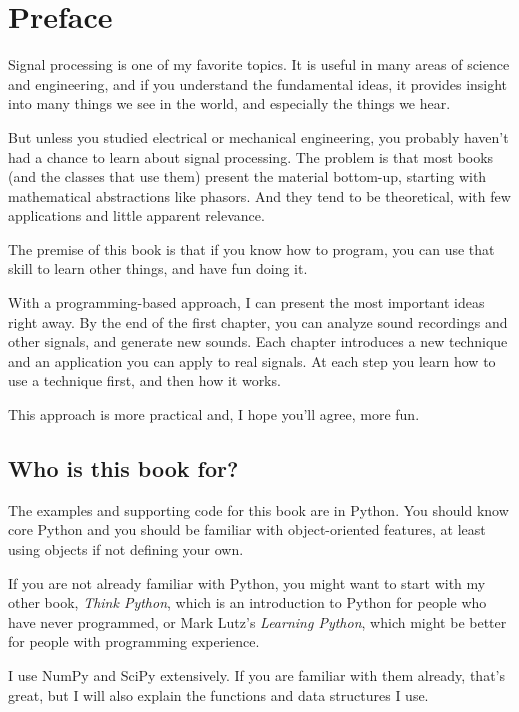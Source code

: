 \chapter{Preface}
\label{preface}

Signal processing is one of my favorite topics.  It is useful
in many areas of science and engineering, and if you understand
the fundamental ideas, it provides insight into many things
we see in the world, and especially the things we hear.

But unless you studied electrical or mechanical engineering, you
probably haven't had a chance to learn about signal processing.  The
problem is that most books (and the classes that use them) present the
material bottom-up, starting with mathematical abstractions like
phasors.  And they tend to be theoretical, with few applications and
little apparent relevance.

The premise of this book is that if you know how to program, you
can use that skill to learn other things, and have fun doing it.

With a programming-based approach, I can present the most important
ideas right away.  By the end of the first chapter, you can analyze
sound recordings and other signals, and generate new sounds.  Each
chapter introduces a new technique and an application you can
apply to real signals.  At each step you learn how to use a
technique first, and then how it works.

This approach is more practical and, I hope you'll agree, more fun.


\section{Who is this book for?}

The examples and supporting code for this book are in Python.  You
should know core Python and you should be
familiar with object-oriented features, at least using objects if not
defining your own.

If you are not already familiar with Python, you might want to start
with my other book, {\it Think Python}, which is an introduction to
Python for people who have never programmed, or Mark
Lutz's {\it Learning Python}, which might be better for people with
programming experience.

I use NumPy and SciPy extensively.  If you are familiar with them
already, that's great, but I will also explain the functions
and data structures I use.

